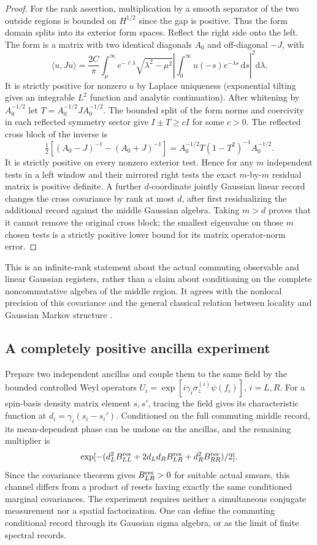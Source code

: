 \documentclass[11pt]{article}
\newcommand{\dd}{\mathrm d}
\begin{document}
\begin{proof}
For the rank assertion, multiplication by a smooth separator of the two outside regions is bounded on \(H^{1/2}\) since the gap is positive. Thus the form domain splits into its exterior form spaces. Reflect the right side onto the left. The form is a matrix with two identical diagonals \(A_0\) and off-diagonal \(-J\), with
\[
 \langle u,Ju\rangle
 =\frac{2C}{\pi}\int_\mu^\infty e^{-\ell\lambda}
     \sqrt{\lambda^2-\mu^2}
   \left|\int_0^\infty u(-s)e^{-\lambda s}\,\dd s\right|^2\dd\lambda .
\]
It is strictly positive for nonzero \(u\) by Laplace uniqueness (exponential tilting gives an integrable \(L^2\) function and analytic continuation). After whitening by \(A_0^{-1/2}\) let \(T=A_0^{-1/2}JA_0^{-1/2}\). The bounded split of the form norms and coercivity in each reflected symmetry sector give \(I\pm T\ge cI\) for some \(c>0\). The reflected cross block of the inverse is
\[
 \tfrac12[(A_0-J)^{-1}-(A_0+J)^{-1}]
          =A_0^{-1/2}T(1-T^2)^{-1}A_0^{-1/2}.
\]
It is strictly positive on every nonzero exterior test. Hence for any \(m\) independent tests in a left window and their mirrored right tests the exact \(m\)-by-\(m\) residual matrix is positive definite. A further \(d\)-coordinate jointly Gaussian linear record changes the cross covariance by rank at most \(d\), after first residualizing the additional record against the middle Gaussian algebra. Taking \(m>d\) proves that it cannot remove the original cross block; the smallest eigenvalue on those \(m\) chosen tests is a strictly positive lower bound for its matrix operator-norm error.
\end{proof}

This is an infinite-rank statement about the actual commuting observable and linear Gaussian registers, rather than a claim about conditioning on the complete noncommutative algebra of the middle region. It agrees with the nonlocal precision of this covariance and the general classical relation between locality and Gaussian Markov structure \cite{rozanov}.

\subsection{A completely positive ancilla experiment}

Prepare two independent ancillas and couple them to the same field by the bounded controlled Weyl operators
\(U_i=\exp[i\gamma_i\sigma_z^{(i)}\psi(f_i)]\), \(i=L,R\).
For a spin-basis density matrix element \(s,s'\), tracing the field gives its characteristic function at \(d_i=\gamma_i(s_i-s_i')\). Conditioned on the full commuting middle record, its mean-dependent phase can be undone on the ancillas, and the remaining multiplier is
\[
 \exp[-(d_L^2 B_{LL}^{\rm res}+2d_Ld_R B_{LR}^{\rm res}
                           +d_R^2 B_{RR}^{\rm res})/2].
\]
Since the covariance theorem gives \(B_{LR}^{\rm res}>0\) for suitable actual smears, this channel differs from a product of resets having exactly the same conditioned marginal covariances. The experiment requires neither a simultaneous conjugate measurement nor a spatial factorization. One can define the commuting conditional record through its Gaussian sigma algebra, or as the limit of finite spectral records.
\end{document}
